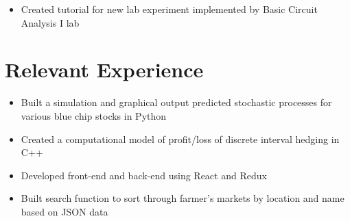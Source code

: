 \documentclass{resume}
\begin{document}
\begin{itemize}[noitemsep,nolistsep]
  \item Created tutorial for new lab experiment implemented by Basic Circuit Analysis I lab
\end{itemize}

\section{%
Relevant Experience}

\begin{itemize}[noitemsep,nolistsep]
  \item Built a simulation and graphical output predicted stochastic processes for various blue chip stocks in Python 
  \item Created a computational model of profit/loss of discrete interval hedging in C++ 
\end{itemize}

\begin{itemize}[noitemsep,nolistsep]
  \item Developed front-end and back-end using React and Redux 
  \item Built search function to sort through farmer's markets by location and name based on JSON data
\end{itemize}

\end{document}
